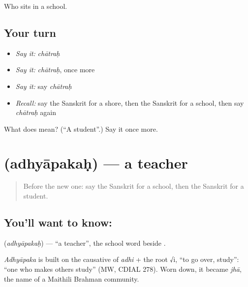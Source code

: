 \begin{grammarlens}[title={What you've built}]
Who sits in a school.
\end{grammarlens}

\subsection*{Your turn}
\begin{itemize}
\raggedright
  \item \emph{Say it:} \emph{chātraḥ}
  \item \emph{Say it:} \emph{chātraḥ}, once more
  \item \emph{Say it:} say \emph{chātraḥ}
  \item \emph{Recall:} say the Sanskrit for a shore, then the Sanskrit for a school, then say \emph{chātraḥ} again
\end{itemize}

\begin{tcolorbox}[breakable,colback=teal!4,colframe=teal!35!black,title={Before you move on}]
What does  mean? (\textquotedblleft{}A student\textquotedblright{}.) Say it once more.
\end{tcolorbox}
\section[\texorpdfstring{\sk{अध्यापकः} (adhyāpakaḥ)}{अध्यापकः (adhyāpakaḥ)}]{ (adhyāpakaḥ) — a teacher}

\label{lesson:SA-C83-teacher}



\begin{quote}
Before the new one: say the Sanskrit for a school, then the Sanskrit for a student.
\end{quote}

\subsection*{You'll want to know: }
\textbf{} (\emph{adhyāpakaḥ}) — \textquotedblleft{}a teacher\textquotedblright{}, the school word beside \textbf{}.

\begin{cousinweb}
\emph{Adhyāpaka} is built on the causative of \emph{adhi} + the root √i, \textquotedblleft{}to go over, study\textquotedblright{}: \textquotedblleft{}one who makes others study\textquotedblright{} (MW, CDIAL 278). Worn down, it became \emph{jhā}, the name of a Maithili Brahman community.
\end{cousinweb}

